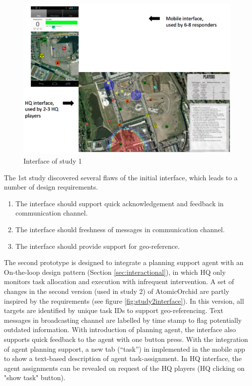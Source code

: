 \begin{figure}[H]
  \centering
  \includegraphics[width=1\textwidth]{img/conclusion/study1interface}
  \caption{Interface of study 1}
  \label{fig:study1interface}
\end{figure}



The 1st study discovered several flaws of the initial interface, which leads to a number of design requirements. 

\begin{enumerate}
	 \item The interface should support quick acknowledgement and feedback in communication channel.
	 \item The interface should freshness of messages in communication channel.
	 \item The interface should provide support for geo-reference.
\end{enumerate}

The second prototype is designed to integrate a planning support agent with an On-the-loop design pattern (Section \ref{sec:interactional}), in which HQ only monitors task allocation and execution with infrequent intervention. A set of changes in the second version (used in study 2) of AtomicOrchid are partly inspired by the requirements (see figure \ref{fig:study2interface}). In this version, all targets are identified by unique task IDs to support geo-referencing. Text messages in broadcasting channel are labelled by time stamp to flag potentially outdated information. With introduction of planning agent, the interface also supports quick feedback to the agent with one button press. With the integration of agent planning support, a new tab (``task'') in implemented in the mobile app to show a text-based description of agent task-assignment. In HQ interface, the agent assignments can be revealed on request of the HQ players (HQ clicking on "show task" button).\\

